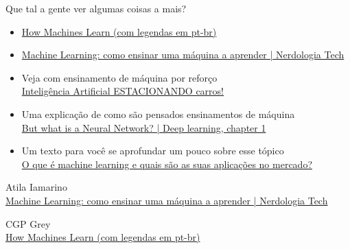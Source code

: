 \documentclass[12pt]{article}
\begin{document}
            Que tal a gente ver algumas coisas a mais?
            \begin{itemize}
            
                \item\href{https://www.youtube.com/watch?v=R9OHn5ZF4Uo&t}{​How Machines Learn (com legendas em pt-br)}
            
                \item\href{https://www.youtube.com/watch?v=mhe5e2B9bL8&t=1s}{Machine Learning: como ensinar uma máquina a aprender | Nerdologia Tech}
            
             \item Veja com ensinamento de máquina por reforço \\ %
             \href{https://www.youtube.com/watch?v=r8KWciNmEGw}{Inteligência Artificial ESTACIONANDO carros!}
            
             \item Uma explicação de como são pensados ensinamentos de máquina 
             \\ %
             \href{https://www.youtube.com/watch?v=aircAruvnKk}{But what is a Neural Network? | Deep learning, chapter 1}
            
             \item Um texto para você se aprofundar um pouco sobre esse tópico  
             \\ %
             \href{https://blog.wittel.com/o-que-e-machine-learning/}{O que é machine learning e quais são as suas aplicações no mercado?}
             
            \end{itemize}
        \begin{thebibliography}{2}
        Atila Iamarino
        \\
        \href{https://www.youtube.com/watch?v=mhe5e2B9bL8&t=1s}{Machine Learning: como ensinar uma máquina a aprender | Nerdologia Tech}
        
     
        CGP Grey \\
        \href{https://www.youtube.com/watch?v=R9OHn5ZF4Uo&t}{​How Machines Learn (com legendas em pt-br)}
     
     
        \end{thebibliography}
          

        
\end{document}
